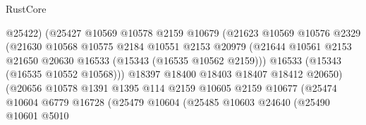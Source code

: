 \begin{lexlean}{RustCore}
\begin{coremodule}
                                      @25422)
                                    (@25427
                                      @10569
                                      @10578
                                      @2159
                                      @10679
                                      (@21623
                                        @10569
                                        @10576
                                        @2329
                                        (@21630
                                          @10568
                                          @10575
                                          @2184
                                          @10551
                                          @2153
                                          @20979
                                          (@21644
                                            @10561
                                            @2153
                                            @21650
                                            @20630
                                            @16533
                                            (@15343 (@16535 @10562 @2159)))
                                          @16533
                                          (@15343 (@16535 @10552 @10568)))
                                        @18397
                                        @18400
                                        @18403
                                        @18407
                                        @18412
                                        @20650)
                                      (@20656
                                        @10578
                                        @1391
                                        @1395
                                        @114
                                        @2159
                                        @10605
                                        @2159
                                        @10677
                                        (@25474
                                          @10604
                                          @6779
                                          @16728
                                          (@25479
                                            @10604
                                            (@25485
                                              @10603
                                              @24640
                                              (@25490
                                                @10601
                                                @5010

\end{coremodule}
\end{lexlean}
